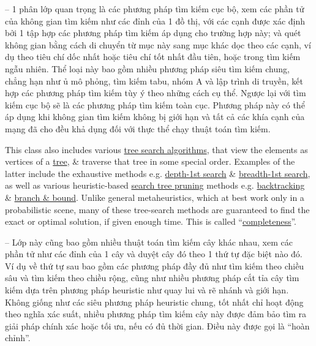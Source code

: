 \documentclass{article}
\begin{document}
\begin{enumerate}
	-- 1 phân lớp quan trọng là các phương pháp tìm kiếm cục bộ, xem các phần tử của không gian tìm kiếm như các đỉnh của 1 đồ thị, với các cạnh được xác định bởi 1 tập hợp các phương pháp tìm kiếm áp dụng cho trường hợp này; và quét không gian bằng cách di chuyển từ mục này sang mục khác dọc theo các cạnh, ví dụ theo tiêu chí dốc nhất hoặc tiêu chí tốt nhất đầu tiên, hoặc trong tìm kiếm ngẫu nhiên. Thể loại này bao gồm nhiều phương pháp siêu tìm kiếm chung, chẳng hạn như ủ mô phỏng, tìm kiếm tabu, nhóm A và lập trình di truyền, kết hợp các phương pháp tìm kiếm tùy ý theo những cách cụ thể. Ngược lại với tìm kiếm cục bộ sẽ là các phương pháp tìm kiếm toàn cục. Phương pháp này có thể áp dụng khi không gian tìm kiếm không bị giới hạn và tất cả các khía cạnh của mạng đã cho đều khả dụng đối với thực thể chạy thuật toán tìm kiếm.
	
	This class also includes various \href{https://en.wikipedia.org/wiki/Tree_traversal}{tree search algorithms}, that view the elements as vertices of a \href{https://en.wikipedia.org/wiki/Tree_(graph_theory)}{tree}, \& traverse that tree in some special order. Examples of the latter include the exhaustive methods e.g. \href{https://en.wikipedia.org/wiki/Depth-first_search}{depth-1st search} \& \href{https://en.wikipedia.org/wiki/Breadth-first_search}{breadth-1st search}, as well as various heuristic-based \href{https://en.wikipedia.org/wiki/Pruning_(decision_trees)}{search tree pruning} methods e.g. \href{https://en.wikipedia.org/wiki/Backtracking}{backtracking} \& \href{https://en.wikipedia.org/wiki/Branch\_and\_bound}{branch \& bound}. Unlike general metaheuristics, which at best work only in a probabilistic scene, many of these tree-search methods are guaranteed to find the exact or optimal solution, if given enough time. This is called ``\href{https://en.wikipedia.org/wiki/Completeness_(logic)}{completeness}''.
	
	-- Lớp này cũng bao gồm nhiều thuật toán tìm kiếm cây khác nhau, xem các phần tử như các đỉnh của 1 cây và duyệt cây đó theo 1 thứ tự đặc biệt nào đó. Ví dụ về thứ tự sau bao gồm các phương pháp đầy đủ như tìm kiếm theo chiều sâu và tìm kiếm theo chiều rộng, cũng như nhiều phương pháp cắt tỉa cây tìm kiếm dựa trên phương pháp heuristic như quay lui và rẽ nhánh và giới hạn. Không giống như các siêu phương pháp heuristic chung, tốt nhất chỉ hoạt động theo nghĩa xác suất, nhiều phương pháp tìm kiếm cây này được đảm bảo tìm ra giải pháp chính xác hoặc tối ưu, nếu có đủ thời gian. Điều này được gọi là ``hoàn chỉnh''.
	

\end{enumerate}
\end{document}

